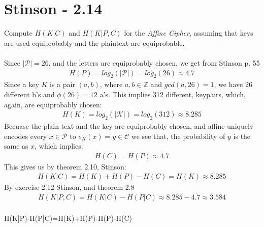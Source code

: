 \documentclass[paper=a4, fontsize=11pt]{scrartcl} %
\numberwithin{equation}{section} %
\numberwithin{figure}{section} %
\numberwithin{table}{section} %
\begin{document}
	\section{Stinson - 2.14}
	Compute $H(K|C)$ and $H(K|P,C)$ for the \textit{Affine Cipher}, assuming that keys are used equiprobably and the plaintext are equiprobable. \\ \\
	Since $|\mathcal{P}|=26$, and the letters are equiprobably chosen, we get from Stinson p. 55 
	\begin{align*}
	H(P)=log_2(|\mathcal{P}|)=log_2(26)\approx 4.7
	\end{align*}
	Since a key $K$ is a pair $(a,b)$, where $a,b\in\mathbb{Z}$ and $gcd(a,26)=1$, we have 26 different b's and $\phi(26)=12$ a's. This implies 312 different, keypairs, which, again, are equiprobably chosen:
	\begin{align*}
	H(K)=log_2(|\mathcal{K}|)=log_2(312)\approx 8.285
	\end{align*}
	Becuase the plain text and the key are equiprobably chosen, and affine uniquely encodes every $x\in\mathcal{P}$ to $e_K(x)=y\in\mathcal{C}$ we see that, the probability of $y$ is the same as $x$, which implies:
	\begin{align*}
	H(C)=H(P)\approx4.7
	\end{align*}
	This gives us by theorem 2.10, Stinson:
	\begin{align*}
	H(K|C) = H(K) + H(P) - H(C) = H(K) \approx 8.285
	\end{align*}
	By exercise 2.12 Stinson, and theorem 2.8 
	\begin{align*}
	H(K|P,C) = H(K|C) - H(P|C) \approx 8.285 - 4.7  \approx 3.584\\
	\end{align*}
	
	H(K|P)-H(P|C)=H(K)+H)P)-H(P)-H(C)
	
\end{document}
